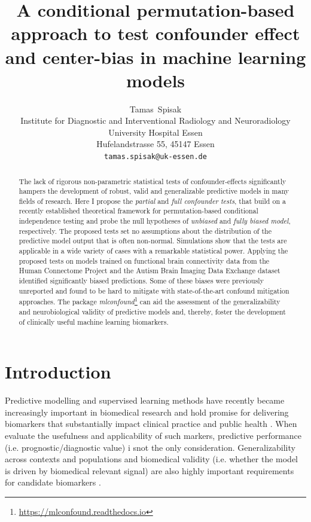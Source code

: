 \documentclass{article}
\title{A conditional permutation-based approach to test confounder effect and center-bias in machine learning models}
\author{
  Tamas~Spisak \\
  Institute for Diagnostic and Interventional Radiology and Neuroradiology \\
  University Hospital Essen\\
  Hufelandstrasse 55, 45147 Essen \\
  \texttt{tamas.spisak@uk-essen.de} \\
}
\begin{document}
\maketitle

\begin{abstract} %
The lack of rigorous non-parametric statistical tests of confounder-effects significantly hampers the development of robust, valid and generalizable predictive models in many fields of research.
Here I propose the \emph{partial} and \emph{full confounder tests}, that build on a recently established theoretical framework for permutation-based conditional independence testing and probe the null hypotheses of \emph{unbiased} and \emph{fully biased model}, respectively.
The proposed tests set no assumptions about the distribution of the predictive model output that is often non-normal.
Simulations show that the tests are applicable in a wide variety of cases with a remarkable statistical power.
Applying the proposed tests on models trained on functional brain connectivity data from the Human Connectome Project and the Autism Brain Imaging Data Exchange dataset identified significantly biased predictions. Some of these biases were previously unreported and found to be hard to mitigate with state-of-the-art confound mitigation approaches.
The package \emph{mlconfound}\footnote{\href{https://mlconfound.readthedocs.io}{https://mlconfound.readthedocs.io}} can aid the assessment of the generalizability and neurobiological validity of predictive models and, thereby, foster the development of clinically useful machine learning biomarkers.
\end{abstract}



\section{Introduction}

Predictive modelling and supervised learning methods have recently became increasingly important in biomedical research and hold promise for delivering biomarkers that substantially impact clinical practice and public health \citep{kent2018personalized}. When evaluate the usefulness and applicability of such markers, predictive performance (i.e. prognostic/diagnostic value) i snot the only consideration. Generalizability across contexts and populations and biomedical validity (i.e. whether the model is driven by biomedical relevant signal) are also highly important requirements for candidate biomarkers \citep{woo2017building}.
\end{document}
